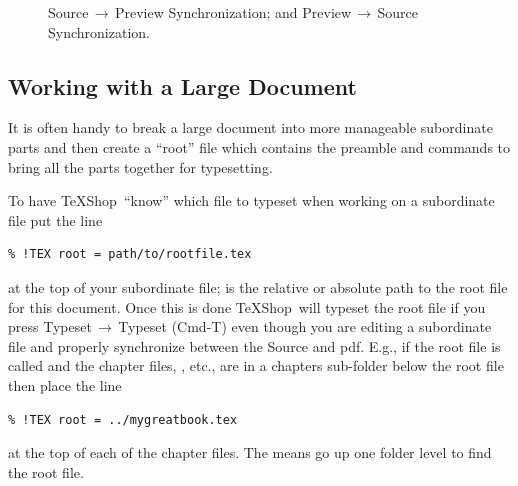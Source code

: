 \documentclass[letterpaper,11pt]{article}
\newcommand{\TS}{\textsf{\TeX Shop}}
\newcommand{\acr}[1]{\textsf{#1}}
\newcommand{\cmd}[1]{\textsf{#1}}
\newcommand{\mnu}[1]{\textsf{#1}}
\newcommand{\To}{\,\(\to\)\,}
\begin{document}
\begin{figure}
\centering
{}%
\qquad%
%
\caption[Source/Preview Synch.]{
 Source\To Preview Synchronization; and
 Preview\To Source Synchronization.}
\label{fig:SourcePreviewSync}
\end{figure}

\subsection{Working with a Large Document}

It is often handy to break a large document into more manageable subordinate parts and then create a ``root'' file which contains the preamble and \verb|| commands to bring all the parts together for typesetting.

To have \TS\ ``know'' which file to typeset when working on a subordinate file put the line
\begin{verbatim}
% !TEX root = path/to/rootfile.tex
\end{verbatim}
at the top of your subordinate file;  is the relative or absolute path to the root file for this document. Once this is done \TS\ will typeset the root file if you press \mnu{Typeset}\To\mnu{Typeset} (\cmd{Cmd-T}) even though you are editing a subordinate file and properly synchronize between the Source and \acr{pdf}. E.g., if the root file is called  and the chapter files, , etc., are in a \cmd{chapters} sub-folder below the root file then place the line
\begin{verbatim}
% !TEX root = ../mygreatbook.tex
\end{verbatim}
at the top of each of the chapter files. The  means go up one folder level to find the root file.
\end{document}
